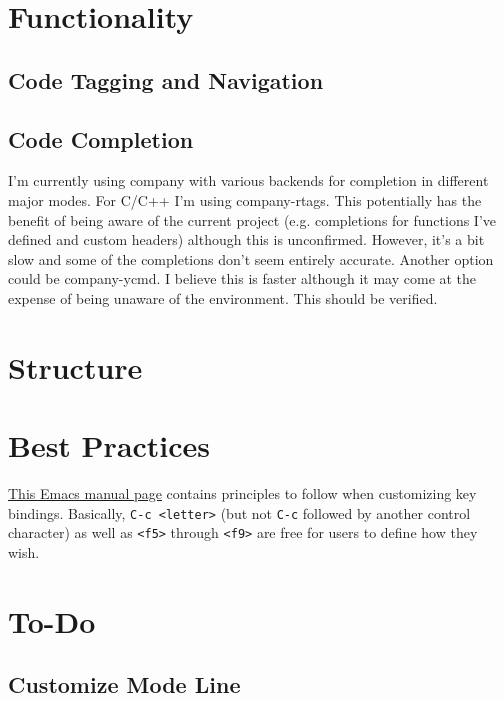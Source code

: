 \documentclass{default}
\begin{document}
\chapter{Functionality}
\label{cha:functionality}

\section{Code Tagging and Navigation}
\label{sec:code-tagging}



\section{Code Completion}
\label{sec:code-completion}

I'm currently using company with various backends for completion in different major modes. For C/C++
I'm using company-rtags. This potentially has the benefit of being aware of the current project
(e.g. completions for functions I've defined and custom headers) although this is
unconfirmed. However, it's a bit slow and some of the completions don't seem entirely
accurate. Another option could be company-ycmd. I believe this is faster although it may come at the
expense of being unaware of the environment. This should be verified.

\chapter{Structure}\label{cha:structure}


\chapter{Best Practices}
\label{cha:best-practices}

\href{https://www.gnu.org/software/emacs/manual/html_node/elisp/Key-Binding-Conventions.html}{This
  Emacs manual page} contains principles to follow when customizing key bindings. Basically,
\texttt{C-c <letter>} (but not \texttt{C-c} followed by another control
character) as well as \texttt{<f5>} through \texttt{<f9>} are free for users to
define how they wish.


\chapter{To-Do}\label{cha:to-do}

\section{Customize Mode Line}
\label{sec:customize-mode-line}
\end{document}
